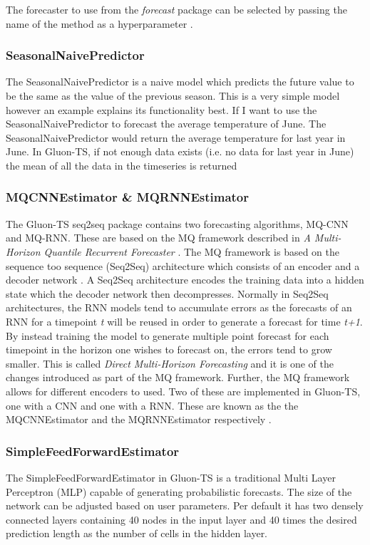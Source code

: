 The forecaster to use from the \textit{forecast} package can be selected by passing the name of the method as a hyperparameter \cite{gluonts-website,r-forecast-package}.

\subsubsection{SeasonalNaivePredictor}
\label{model:seasonal_naive}
The SeasonalNaivePredictor is a naive model which predicts the future value to be the same as the value of the previous season. This is a very simple model however an example explains its functionality best. If I want to use the SeasonalNaivePredictor to forecast the average temperature of June. The SeasonalNaivePredictor would return the average temperature for last year in June. In Gluon-TS, if not enough data exists (i.e. no data for last year in June) the mean of all the data in the timeseries is returned \cite{gluonts-website,hyndman_forecasting_3rd}

\subsubsection{MQCNNEstimator \& MQRNNEstimator}
The Gluon-TS seq2seq package contains two forecasting algorithms, MQ-CNN and MQ-RNN. These are based on the MQ framework described in \textit{A Multi-Horizon Quantile Recurrent Forecaster} \cite{wen_multi-horizon_2018}. The MQ framework is based on the sequence too sequence (Seq2Seq) architecture  which consists of an encoder and a decoder network \cite{seq2seq}. A Seq2Seq architecture encodes the training data into a hidden state which the decoder network then decompresses. Normally in Seq2Seq architectures, the RNN models tend to accumulate errors as the forecasts of an RNN for a timepoint \textit{t} will be reused in order to generate a forecast for time \textit{t+1}. By instead training the model to generate multiple point forecast for each timepoint in the horizon one wishes to forecast on, the errors tend to grow smaller. This is called \textit{Direct Multi-Horizon Forecasting} and it is one of the changes introduced as part of the MQ framework. Further, the MQ framework allows for different encoders to used. Two of these are implemented in Gluon-TS, one with a CNN and one with a RNN. These are known as the the MQCNNEstimator and the MQRNNEstimator respectively \cite{gluonts-website}.

\subsubsection{SimpleFeedForwardEstimator}
\label{algo:simplefeedforward}
The SimpleFeedForwardEstimator in Gluon-TS is a traditional Multi Layer Perceptron (MLP) capable of generating probabilistic forecasts. The size of the network can be adjusted based on user parameters. Per default it has two densely connected layers containing 40 nodes in the input layer and 40 times the desired prediction length as the number of cells in the hidden layer.


